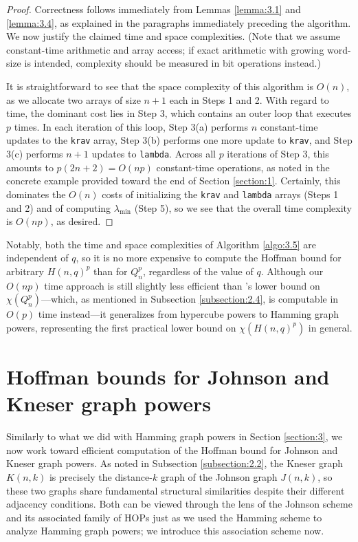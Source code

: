 \documentclass{article}
\numberwithin{equation}{section}
\theoremstyle{plain}
\begin{document}
\begin{proof}
    Correctness follows immediately from Lemmas \ref{lemma:3.1} and \ref{lemma:3.4}, as explained in the paragraphs immediately preceding the algorithm. We now justify the claimed time and space complexities. (Note that we assume constant-time arithmetic and array access; if exact arithmetic with growing word-size is intended, complexity should be measured in bit operations instead.)

    It is straightforward to see that the space complexity of this algorithm is $O(n)$, as we allocate two arrays of size $n + 1$ each in Steps 1 and 2. With regard to time, the dominant cost lies in Step $3$, which contains an outer loop that executes $p$ times. In each iteration of this loop, Step 3(a) performs $n$ constant-time updates to the \texttt{krav} array, Step 3(b) performs one more update to \texttt{krav}, and Step 3(c) performs $n + 1$ updates to \texttt{lambda}. Across all $p$ iterations of Step 3, this amounts to $p(2n + 2) = O(np)$ constant-time operations, as noted in the concrete example provided toward the end of Section \ref{section:1}. Certainly, this dominates the $O(n)$ costs of initializing the \texttt{krav} and \texttt{lambda} arrays (Steps 1 and 2) and of computing $\lambda_{\text{min}}$ (Step 5), so we see that the overall time complexity is $O(np)$, as desired.
\end{proof}

Notably, both the time and space complexities of Algorithm \ref{algo:3.5} are independent of $q$, so it is no more expensive to compute the Hoffman bound for arbitrary $H(n, q)^p$ than for $Q_n^p$, regardless of the value of $q$. Although our $O(np)$ time approach is still slightly less efficient than \cite{FFR17}'s lower bound on $\chi(Q_n^p)$---which, as mentioned in Subsection \ref{subsection:2.4}, is computable in $O(p)$ time instead---it generalizes from hypercube powers to Hamming graph powers, representing the first practical lower bound on $\chi(H(n, q)^p)$ in general.

\section{Hoffman bounds for Johnson and Kneser graph powers}\label{section:4}

Similarly to what we did with Hamming graph powers in Section \ref{section:3}, we now work toward efficient computation of the Hoffman bound for Johnson and Kneser graph powers. As noted in Subsection \ref{subsection:2.2}, the Kneser graph $K(n, k)$ is precisely the distance-$k$ graph of the Johnson graph $J(n, k)$, so these two graphs share fundamental structural similarities despite their different adjacency conditions. Both can be viewed through the lens of the Johnson scheme and its associated family of HOPs just as we used the Hamming scheme to analyze Hamming graph powers; we introduce this association scheme now.
\end{document}
